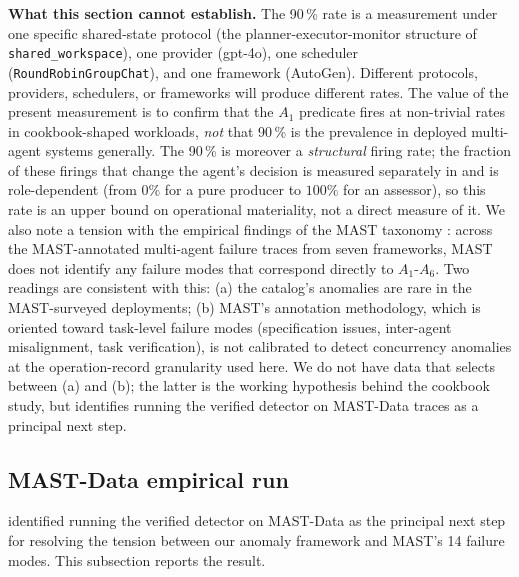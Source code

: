 \documentclass[journal,compsoc,10pt]{IEEEtran}
\providecommand{\citep}{\cite}
\theoremstyle{definition}
\theoremstyle{remark}
\begin{document}
\medskip
\noindent\textbf{What this section cannot establish.}
The 90\,\% rate is a measurement under one specific
shared-state protocol (the planner-executor-monitor structure
of \texttt{shared\_workspace}), one provider (gpt-4o), one
scheduler (\texttt{RoundRobinGroupChat}), and one framework
(AutoGen). Different protocols, providers, schedulers, or
frameworks will produce different rates. The value of the
present measurement is to confirm that the $A_1$ predicate
fires at non-trivial rates in cookbook-shaped workloads,
\emph{not} that 90\,\% is the prevalence in deployed
multi-agent systems generally. The 90\,\% is moreover a
\emph{structural} firing rate; the fraction of these firings
that change the agent's decision is measured separately in
 and is role-dependent
(from $0\%$ for a pure producer to $100\%$ for an assessor),
so this rate is an upper bound on operational materiality,
not a direct measure of it.
We also note a tension with the empirical findings of the
MAST taxonomy \citep{CemriEtAl2025MAST}: across the
MAST-annotated multi-agent failure traces from seven
frameworks, MAST does
not identify any failure modes that correspond directly to
$A_1$-$A_6$. Two readings are consistent with this:
(a) the catalog's anomalies are rare in the MAST-surveyed
deployments; (b) MAST's annotation methodology, which is
oriented toward task-level failure modes (specification
issues, inter-agent misalignment, task verification), is not
calibrated to detect concurrency anomalies at the
operation-record granularity used here. We do not have data
that selects between (a) and (b); the latter is the
working hypothesis behind the cookbook study, but
 identifies running the verified
detector on MAST-Data traces as a principal next step.

\subsection{MAST-Data empirical run}
\label{sec:mast-empirical}

 identified running the verified detector
on MAST-Data \citep{CemriEtAl2025MAST} as the principal next
step for resolving the tension between our anomaly framework
and MAST's 14 failure modes. This subsection reports the
result.
\end{document}
